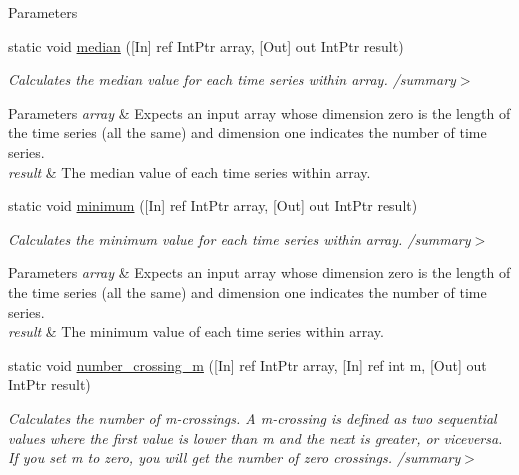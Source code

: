 \begin{DoxyCompactItemize}
\begin{DoxyCompactList}
\begin{DoxyParams}{Parameters}
\hline
\end{DoxyParams}
\end{DoxyCompactList}\item 
static void \mbox{\hyperlink{classkhiva_1_1interop_1_1_d_l_l_features_a7d81c9be7dd0383ee0aa696a86232255}{median}} (\mbox{[}In\mbox{]} ref Int\+Ptr array, \mbox{[}Out\mbox{]} out Int\+Ptr result)
\begin{DoxyCompactList}\small\item\em Calculates the median value for each time series within array. /summary$>$ 
\begin{DoxyParams}{Parameters}
{\em array} & Expects an input array whose dimension zero is the length of the time series (all the same) and dimension one indicates the number of time series.\\
\hline
{\em result} & The median value of each time series within array.\\
\hline
\end{DoxyParams}
\end{DoxyCompactList}\item 
static void \mbox{\hyperlink{classkhiva_1_1interop_1_1_d_l_l_features_a3be3069b086e3790b877a535b267bd43}{minimum}} (\mbox{[}In\mbox{]} ref Int\+Ptr array, \mbox{[}Out\mbox{]} out Int\+Ptr result)
\begin{DoxyCompactList}\small\item\em Calculates the minimum value for each time series within array. /summary$>$ 
\begin{DoxyParams}{Parameters}
{\em array} & Expects an input array whose dimension zero is the length of the time series (all the same) and dimension one indicates the number of time series.\\
\hline
{\em result} & The minimum value of each time series within array.\\
\hline
\end{DoxyParams}
\end{DoxyCompactList}\item 
static void \mbox{\hyperlink{classkhiva_1_1interop_1_1_d_l_l_features_abdfebe8a203d23b22848cd2a8e4f033d}{number\+\_\+crossing\+\_\+m}} (\mbox{[}In\mbox{]} ref Int\+Ptr array, \mbox{[}In\mbox{]} ref int m, \mbox{[}Out\mbox{]} out Int\+Ptr result)
\begin{DoxyCompactList}\small\item\em Calculates the number of m-\/crossings. A m-\/crossing is defined as two sequential values where the first value is lower than m and the next is greater, or viceversa. If you set m to zero, you will get the number of zero crossings. /summary$>$ 

\end{DoxyCompactList}
\end{DoxyCompactItemize}
